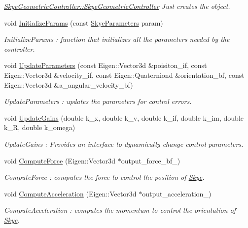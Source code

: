 \begin{DoxyCompactItemize}
\begin{DoxyCompactList}\small\item\em \hyperlink{class_skye_geometric_controller_a40739735f7c55b861647ecad873080ac}{Skye\-Geometric\-Controller\-::\-Skye\-Geometric\-Controller} Just creates the object. \end{DoxyCompactList}\item 
void \hyperlink{class_skye_geometric_controller_a78773edf4b0a80b1e26daec62b17a42a}{Initialize\-Params} (const \hyperlink{struct_skye_parameters}{Skye\-Parameters} param)
\begin{DoxyCompactList}\small\item\em Initialize\-Params \-: function that initializes all the parameters needed by the controller. \end{DoxyCompactList}\item 
void \hyperlink{class_skye_geometric_controller_a59e2b48fa22a5910cf932cd8217ae062}{Update\-Parameters} (const Eigen\-::\-Vector3d \&poisiton\-\_\-if, const Eigen\-::\-Vector3d \&velocity\-\_\-if, const Eigen\-::\-Quaterniond \&orientation\-\_\-bf, const Eigen\-::\-Vector3d \&a\-\_\-angular\-\_\-velocity\-\_\-bf)
\begin{DoxyCompactList}\small\item\em Update\-Parameters \-: updates the parameters for control errors. \end{DoxyCompactList}\item 
void \hyperlink{class_skye_geometric_controller_a86e1970fa9f94b0a1d09b7368ee19bf8}{Update\-Gains} (double k\-\_\-x, double k\-\_\-v, double k\-\_\-if, double k\-\_\-im, double k\-\_\-\-R, double k\-\_\-omega)
\begin{DoxyCompactList}\small\item\em Update\-Gains \-: Provides an interface to dynamically change control parameters. \end{DoxyCompactList}\item 
void \hyperlink{class_skye_geometric_controller_a3dcbe7dd5bdb17ba15509efa22f19168}{Compute\-Force} (Eigen\-::\-Vector3d $\ast$output\-\_\-force\-\_\-bf\-\_\-)
\begin{DoxyCompactList}\small\item\em Compute\-Force \-: computes the force to control the position of \hyperlink{class_skye}{Skye}. \end{DoxyCompactList}\item 
void \hyperlink{class_skye_geometric_controller_af7accd98eca41f18232aaea6dff03b93}{Compute\-Acceleration} (Eigen\-::\-Vector3d $\ast$output\-\_\-acceleration\-\_\-)
\begin{DoxyCompactList}\small\item\em Compute\-Acceleration \-: computes the momentum to control the orientation of \hyperlink{class_skye}{Skye}. \end{DoxyCompactList}\end{DoxyCompactItemize}


